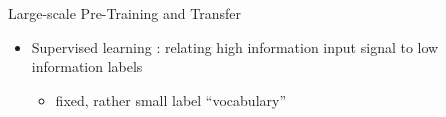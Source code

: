 \begin{frame}{Large-scale Pre-Training and Transfer}
\protect\hypertarget{large-scale-pre-training-and-transfer-2}{}
\begin{itemize}
\tightlist
\item
  Supervised learning : relating high information input signal to low
  information labels

  \begin{itemize}
  \tightlist
  \item
    fixed, rather small label ``vocabulary''
  \end{itemize}
\end{itemize}

\end{frame}

